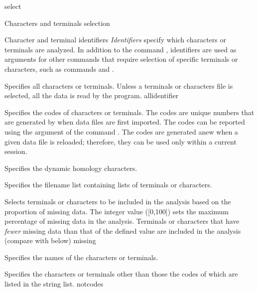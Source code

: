 \begin{command}{select}{}
\begin{arguments}
\begin{argumentgroup}{Characters and terminals selection}
\end{argumentgroup}

\begin{argumentgroup}{Character and terminal identifiers}\label{identifiers}
{\emph{Identifiers} specify which characters or terminals are analyzed.
In addition to the command , identifiers are used as
arguments for other commands that require selection of specific terminals or
characters, such as commands  and
.}

{Specifies all characters or terminals. Unless a terminals or characters file
is selected, all the data is read by the program.}
{allidentifier}

{Specifies the codes of characters or terminals. The codes are unique
numbers that are generated by \poy when data files are first imported.
The codes can be reported using the argument 
of the command . The codes are generated anew
when a given data file is reloaded; therefore, they can be used
only within a current \poy session.}
{}

{Specifies the dynamic homology characters.}
{}

{Specifies the filename list containing lists of terminals or
characters.}
{}

{Selects terminals or characters to be included in the analysis
based on the proportion of missing data. The
integer value ([0,100]) sets the maximum percentage of missing
data in the analysis. Terminals or characters that have \emph{fewer} 
missing data than that of the defined value are included in the analysis 
(compare with  below)}
{missing}

{Specifies the names of the characters or terminals.}
{}

{Specifies the characters or terminals other than those the
codes of which are listed in the string list.}
{notcodes}


\end{argumentgroup}
\end{arguments}
\end{command}

